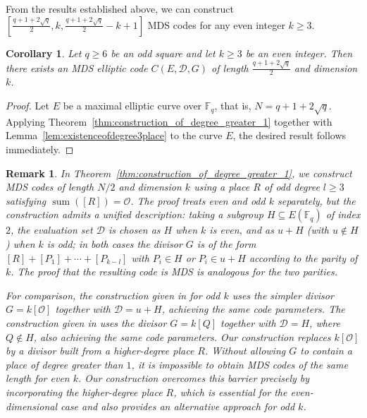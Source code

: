 \documentclass[journal,12pt,onecolumn]{IEEEtran}
\newtheorem{corollary}[theorem]{Corollary}
\newtheorem{remark}[theorem]{Remark}
\newcommand{\Point}{\operatorname{sum}}
\begin{document}
From the results established above, we can construct $[\frac{q+1+2\sqrt{q}}{2}, k, \frac{q+1+2\sqrt{q}}{2}-k+1]$ MDS codes for any even integer $k \ge 3$.

\begin{corollary}
Let $q \ge 6$ be an odd square and let $k \ge 3$ be an even integer. Then there exists an MDS elliptic code $C(E, \mathcal{D}, G)$ of length $\frac{q+1+2\sqrt{q}}{2}$ and dimension $k$.
\end{corollary}

\begin{proof}
Let $E$ be a maximal elliptic curve over $\mathbb{F}_q$, that is, $N = q + 1 + 2\sqrt{q}$. Applying Theorem~\ref{thm:construction_of_degree_greater_1} together with Lemma~\ref{lem:existenceofdegree3place} to the curve $E$, the desired result follows immediately.
\end{proof}


\begin{remark}\label{remark:N/2,odd l}
In Theorem~\ref{thm:construction_of_degree_greater_1}, we construct MDS codes of length $N/2$ and dimension $k$ using a place $R$ of odd degree $l \ge 3$ satisfying $\Point([R]) = \mathcal{O}$. The proof treats even and odd $k$ separately, but the construction admits a unified description: taking a subgroup $H \subseteq E(\mathbb{F}_q)$ of index $2$, the evaluation set $\mathcal{D}$ is chosen as $H$ when $k$ is even, and as $u+H$ (with $u \notin H$) when $k$ is odd; in both cases the divisor $G$ is of the form $[R] + [P_1] + \cdots + [P_{k-l}]$ with $P_i \in H$ or $P_i \in u+H$ according to the parity of $k$. The proof that the resulting code is MDS is analogous for the two parities.

For comparison, the construction given in \cite{MR4564628} for odd $k$ uses the simpler divisor $G = k[\mathcal{O}]$ together with $\mathcal{D} = u + H$, achieving the same code parameters. {\color{blue}The construction given in \cite{wang2025nonreedsolomontypemdscodes} uses the divisor $G = k[Q]$ together with $\mathcal{D} = H$, where $Q \notin H$, also achieving the same code parameters.} Our construction replaces $k[\mathcal{O}]$ by a divisor built from a higher-degree place $R$. Without allowing $G$ to contain a place of degree greater than $1$, it is impossible to obtain MDS codes of the same length for even $k$. Our construction overcomes this barrier precisely by incorporating the higher-degree place $R$, which is essential for the even-dimensional case and also provides an alternative approach for odd $k$.
\end{remark}
\end{document}
